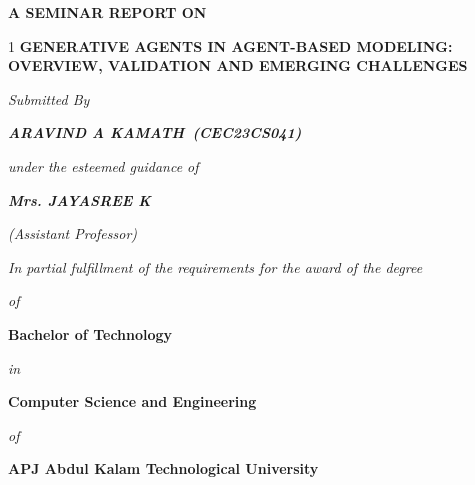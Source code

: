 \documentclass[12pt,a4paper]{report}
\newcommand{\studentname}{ARAVIND A KAMATH}
\newcommand{\rollno}{CEC23CS041}
\newcommand{\guidename}{Mrs. JAYASREE K}
\begin{document}

\begin{titlepage}
\thispagestyle{empty}
\begin{center}

\vspace*{0.2cm}

{\Large\bfseries A SEMINAR REPORT ON}\par

\vspace{0.45cm}

{\begin{spacing}{1}
\fontsize{16}{24}\selectfont\bfseries\centering
GENERATIVE AGENTS IN AGENT-BASED MODELING:\\
OVERVIEW, VALIDATION AND EMERGING CHALLENGES\par
\end{spacing}}

\vspace{0.55cm}

{\large\itshape Submitted By}\par
\vspace{0.2cm}
{\large\bfseries\itshape \studentname\ (\rollno)}\par

\vspace{0.4cm}

{\large\itshape under the esteemed guidance of}\par
\vspace{0.2cm}
{\large\bfseries\itshape \guidename}\par
\vspace{0.1cm}
{\large\itshape (Assistant Professor)}\par

\vspace{0.4cm}

{\large\itshape In partial fulfillment of the requirements for the award of the degree}\par
{\large\itshape of}\par
{\large\bfseries Bachelor of Technology}\par
{\large\itshape in}\par
{\large\bfseries Computer Science and Engineering}\par
{\large\itshape of}\par
{\large\bfseries APJ Abdul Kalam Technological University}\par


\end{center}
\end{titlepage}
\end{document}
